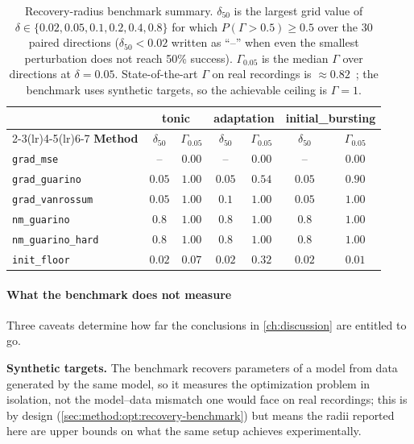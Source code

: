 \begin{table}[!hb]
\centering
\caption{Recovery-radius benchmark summary. $\delta_{50}$ is the largest grid value of $\delta\in\{0.02,0.05,0.1,0.2,0.4,0.8\}$ for which $P(\Gamma>0.5)\geq 0.5$ over the 30 paired directions ($\delta_{50} < 0.02$ written as ``--'' when even the smallest perturbation does not reach 50\% success). $\Gamma_{0.05}$ is the median $\Gamma$ over directions at $\delta=0.05$. State-of-the-art $\Gamma$ on real recordings is $\approx 0.82$~\cite{Jolivet2008}; the benchmark uses synthetic targets, so the achievable ceiling is $\Gamma=1$.}
\label{tab:results-summary}
\footnotesize
\setlength{\tabcolsep}{2.5pt}
\begin{tabular}{lcccccc}
\toprule
& \multicolumn{2}{c}{\textbf{tonic}} & \multicolumn{2}{c}{\textbf{adaptation}} & \multicolumn{2}{c}{\textbf{initial\_bursting}} \\
\cmidrule(lr){2-3}\cmidrule(lr){4-5}\cmidrule(lr){6-7}
\textbf{Method} & $\delta_{50}$ & $\Gamma_{0.05}$ & $\delta_{50}$ & $\Gamma_{0.05}$ & $\delta_{50}$ & $\Gamma_{0.05}$ \\
\midrule
\texttt{grad\_mse}         & --     & $0.00$ & --     & $0.00$ & --     & $0.00$ \\
\texttt{grad\_guarino}     & $0.05$ & $1.00$ & $0.05$ & $0.54$ & $0.05$ & $0.90$ \\
\texttt{grad\_vanrossum}   & $0.05$ & $1.00$ & $0.1$  & $1.00$ & $0.05$ & $1.00$ \\
\texttt{nm\_guarino}       & $0.8$  & $1.00$ & $0.8$  & $1.00$ & $0.8$  & $1.00$ \\
\texttt{nm\_guarino\_hard} & $0.8$  & $1.00$ & $0.8$  & $1.00$ & $0.8$  & $1.00$ \\
\midrule
\texttt{init\_floor}       & $0.02$ & $0.07$ & $0.02$ & $0.32$ & $0.02$ & $0.01$ \\
\bottomrule
\end{tabular}
\end{table}

\paragraph{What the benchmark does not measure}
Three caveats determine how far the conclusions in \cref{ch:discussion} are entitled to go.

\textbf{Synthetic targets.} The benchmark recovers parameters of a model from data generated by the same model, so it measures the optimization problem in isolation, not the model--data mismatch one would face on real recordings; this is by design (\cref{sec:method:opt:recovery-benchmark}) but means the radii reported here are upper bounds on what the same setup achieves experimentally.

